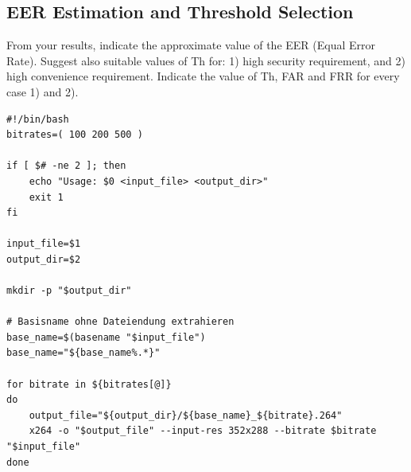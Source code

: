 \documentclass[a4paper,12pt]{article}
\begin{document}
\subsection{EER Estimation and Threshold Selection}
From your results, indicate the approximate value of the EER (Equal Error Rate). Suggest also suitable values of Th for: 1) high security requirement, and 2) high convenience requirement. Indicate the value of Th, FAR and FRR for every case 1) and 2).



\tableofcontents
\newpage

\listoffigures
\newpage

\listoftables
\newpage

\captionsetup{type=listing}
\begin{verbatim}
#!/bin/bash
bitrates=( 100 200 500 )

if [ $# -ne 2 ]; then
	echo "Usage: $0 <input_file> <output_dir>"
	exit 1
fi

input_file=$1
output_dir=$2

mkdir -p "$output_dir"

# Basisname ohne Dateiendung extrahieren
base_name=$(basename "$input_file")
base_name="${base_name%.*}"

for bitrate in ${bitrates[@]}
do
	output_file="${output_dir}/${base_name}_${bitrate}.264"
	x264 -o "$output_file" --input-res 352x288 --bitrate $bitrate "$input_file"
done
\end{verbatim}
\label{lst:bashscript_x264_bitrates}
\vspace{10pt}

\newpage
\printbibliography
\end{document}
